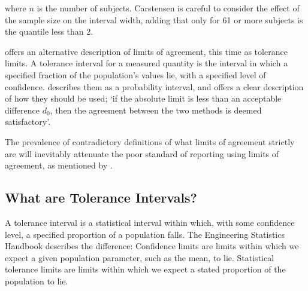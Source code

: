 \documentclass[Main.tex]{subfiles}
\begin{document}
\noindent where $n$ is the number of subjects. Carstensen is
careful to consider the effect of the sample size on the interval
width, adding that only for 61 or more subjects is the
quantile less than 2.

\citet{luiz} offers an alternative description of limits of
agreement, this time as tolerance limits. A tolerance interval for
a measured quantity is the interval in which a specified fraction
of the population's values lie, with a specified level of
confidence. \citet{Barnhart} describes them as a probability
interval, and offers a clear description of how they should be
used; `if the absolute limit is less than an acceptable difference
$d_{0}$, then the agreement between the two methods is deemed
satisfactory'.

The prevalence of contradictory definitions of what limits of agreement strictly are will inevitably attenuate the poor standard of reporting using limits of agreement, as mentioned by \citet{mantha}.





















	
	\subsection*{What are Tolerance Intervals?}
	A tolerance interval is a statistical interval within which, with some confidence level, a specified proportion of a population falls.
	The Engineering Statistics Handbook describes the difference: Confidence limits are limits within which we expect a given population parameter, such as the mean, to lie. Statistical tolerance limits are limits within which we expect a stated proportion of the population to lie.
	
\end{document}
